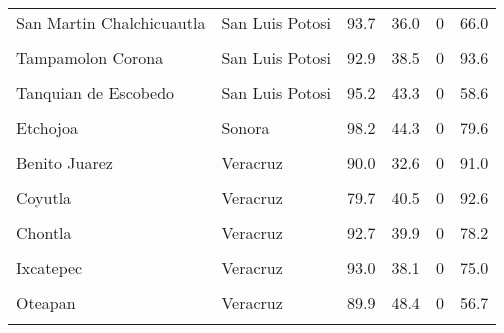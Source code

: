\documentclass[
]{report}
\begin{document}
\begin{longtable}[t]{llrrrr}
San Martin Chalchicuautla & San Luis Potosi & 93.7 & 36.0 & 0 & 66.0\\
\cellcolor{gray!6}{Tampacan} & \cellcolor{gray!6}{San Luis Potosi} & \cellcolor{gray!6}{96.0} & \cellcolor{gray!6}{39.9} & \cellcolor{gray!6}{0} & \cellcolor{gray!6}{85.3}\\
\addlinespace
Tampamolon Corona & San Luis Potosi & 92.9 & 38.5 & 0 & 93.6\\
\cellcolor{gray!6}{Tanlajas} & \cellcolor{gray!6}{San Luis Potosi} & \cellcolor{gray!6}{93.2} & \cellcolor{gray!6}{30.7} & \cellcolor{gray!6}{0} & \cellcolor{gray!6}{92.2}\\
Tanquian de Escobedo & San Luis Potosi & 95.2 & 43.3 & 0 & 58.6\\
\cellcolor{gray!6}{Matlapa} & \cellcolor{gray!6}{San Luis Potosi} & \cellcolor{gray!6}{88.3} & \cellcolor{gray!6}{33.8} & \cellcolor{gray!6}{0} & \cellcolor{gray!6}{86.8}\\
Etchojoa & Sonora & 98.2 & 44.3 & 0 & 79.6\\
\addlinespace
\cellcolor{gray!6}{Benito Juarez} & \cellcolor{gray!6}{Sonora} & \cellcolor{gray!6}{98.5} & \cellcolor{gray!6}{44.4} & \cellcolor{gray!6}{0} & \cellcolor{gray!6}{50.9}\\
Benito Juarez & Veracruz & 90.0 & 32.6 & 0 & 91.0\\
\cellcolor{gray!6}{Coxquihui} & \cellcolor{gray!6}{Veracruz} & \cellcolor{gray!6}{85.7} & \cellcolor{gray!6}{35.0} & \cellcolor{gray!6}{0} & \cellcolor{gray!6}{95.8}\\
Coyutla & Veracruz & 79.7 & 40.5 & 0 & 92.6\\
\cellcolor{gray!6}{Chiconamel} & \cellcolor{gray!6}{Veracruz} & \cellcolor{gray!6}{79.4} & \cellcolor{gray!6}{33.0} & \cellcolor{gray!6}{0} & \cellcolor{gray!6}{57.2}\\
\addlinespace
Chontla & Veracruz & 92.7 & 39.9 & 0 & 78.2\\
\cellcolor{gray!6}{Chumatlan} & \cellcolor{gray!6}{Veracruz} & \cellcolor{gray!6}{79.8} & \cellcolor{gray!6}{32.3} & \cellcolor{gray!6}{0} & \cellcolor{gray!6}{99.0}\\
Ixcatepec & Veracruz & 93.0 & 38.1 & 0 & 75.0\\
\cellcolor{gray!6}{Magdalena} & \cellcolor{gray!6}{Veracruz} & \cellcolor{gray!6}{79.9} & \cellcolor{gray!6}{38.8} & \cellcolor{gray!6}{0} & \cellcolor{gray!6}{98.6}\\
Oteapan & Veracruz & 89.9 & 48.4 & 0 & 56.7\\
\addlinespace
\cellcolor{gray!6}{Rafael Delgado} & \cellcolor{gray!6}{Veracruz} & \cellcolor{gray!6}{91.3} & \cellcolor{gray!6}{47.8} & \cellcolor{gray!6}{0} & \cellcolor{gray!6}{83.4}\\

\end{longtable}
\end{document}
